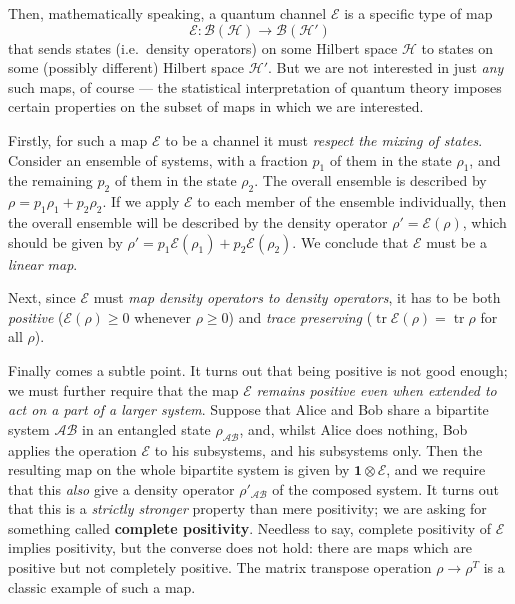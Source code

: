 \documentclass[fleqn]{article}
\begin{document}
Then, mathematically speaking, a quantum channel \(\mathcal{E}\) is a specific type of map
\[
  \mathcal{E}\colon \mathcal{B}(\mathcal{H}) \to \mathcal{B}(\mathcal{H}')
\]
that sends states (i.e.~density operators) on some Hilbert space \(\mathcal{H}\) to states on some (possibly different) Hilbert space \(\mathcal{H}'\).
But we are not interested in just \emph{any} such maps, of course --- the statistical interpretation of quantum theory imposes certain properties on the subset of maps in which we are interested.

Firstly, for such a map \(\mathcal{E}\) to be a channel it must \emph{respect the mixing of states}.
Consider an ensemble of systems, with a fraction \(p_1\) of them in the state \(\rho_1\), and the remaining \(p_2\) of them in the state \(\rho_2\).
The overall ensemble is described by \(\rho=p_1\rho_1+p_2\rho_2\).
If we apply \(\mathcal{E}\) to each member of the ensemble individually, then the overall ensemble will be described by the density operator \(\rho'=\mathcal{E}(\rho)\), which should be given by \(\rho'=p_1\mathcal{E}(\rho_1)+p_2\mathcal{E}(\rho_2)\).
We conclude that \(\mathcal{E}\) must be a \emph{linear map}.

Next, since \(\mathcal{E}\) must \emph{map density operators to density operators}, it has to be both \emph{positive} (\(\mathcal{E}(\rho)\geqslant 0\) whenever \(\rho\geqslant 0\)) and \emph{trace preserving} (\(\operatorname{tr}\mathcal{E}(\rho)=\operatorname{tr}\rho\) for all \(\rho\)).

Finally comes a subtle point.
It turns out that being positive is not good enough;
we must further require that the map \(\mathcal{E}\) \emph{remains positive even when extended to act on a part of a larger system}.
Suppose that Alice and Bob share a bipartite system \(\mathcal{AB}\) in an entangled state \(\rho_\mathcal{AB}\), and, whilst Alice does nothing, Bob applies the operation \(\mathcal{E}\) to his subsystems, and his subsystems only.
Then the resulting map on the whole bipartite system is given by \(\mathbf{1}\otimes\mathcal{E}\), and we require that this \emph{also} give a density operator \(\rho'_\mathcal{AB}\) of the composed system.
It turns out that this is a \emph{strictly stronger} property than mere positivity;
we are asking for something called \textbf{complete positivity}.
Needless to say, complete positivity of \(\mathcal{E}\) implies positivity, but the converse does not hold: there are maps which are positive but not completely positive.
The matrix transpose operation \(\rho\rightarrow\rho^T\) is a classic example of such a map.
\end{document}
